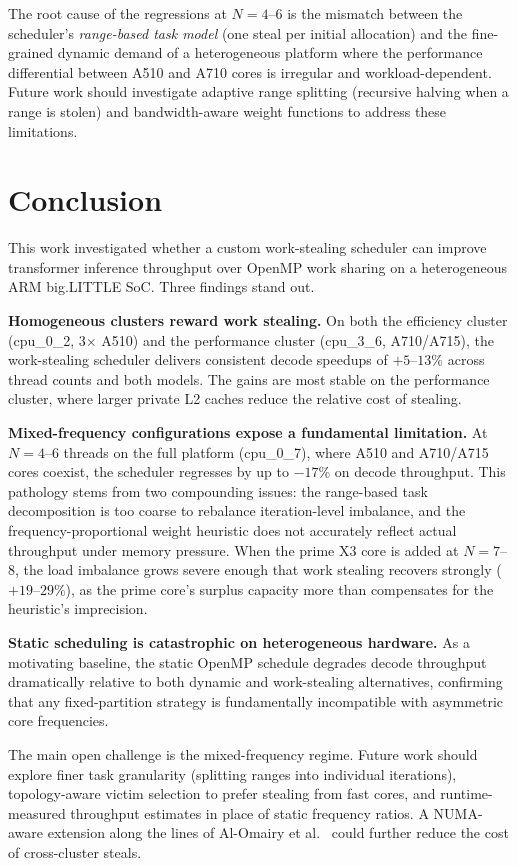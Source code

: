 \documentclass[11pt,english]{article}
\begin{document}
The root cause of the regressions at $N=4$--$6$ is the mismatch between the scheduler's \emph{range-based task model} (one steal per initial allocation) and the fine-grained dynamic demand of a heterogeneous platform where the performance differential between A510 and A710 cores is irregular and workload-dependent. Future work should investigate adaptive range splitting (recursive halving when a range is stolen) and bandwidth-aware weight functions to address these limitations.

\section{Conclusion}
This work investigated whether a custom work-stealing scheduler can improve transformer inference throughput over OpenMP work sharing on a heterogeneous ARM big.LITTLE SoC. Three findings stand out.

\textbf{Homogeneous clusters reward work stealing.} On both the efficiency cluster (cpu\_0\_2, 3$\times$ A510) and the performance cluster (cpu\_3\_6, A710/A715), the work-stealing scheduler delivers consistent decode speedups of $+5$--$13\%$ across thread counts and both models. The gains are most stable on the performance cluster, where larger private L2 caches reduce the relative cost of stealing.

\textbf{Mixed-frequency configurations expose a fundamental limitation.} At $N = 4$--$6$ threads on the full platform (cpu\_0\_7), where A510 and A710/A715 cores coexist, the scheduler regresses by up to $-17\%$ on decode throughput. This pathology stems from two compounding issues: the range-based task decomposition is too coarse to rebalance iteration-level imbalance, and the frequency-proportional weight heuristic does not accurately reflect actual throughput under memory pressure. When the prime X3 core is added at $N = 7$--$8$, the load imbalance grows severe enough that work stealing recovers strongly ($+19$--$29\%$), as the prime core's surplus capacity more than compensates for the heuristic's imprecision.

\textbf{Static scheduling is catastrophic on heterogeneous hardware.} As a motivating baseline, the static OpenMP schedule degrades decode throughput dramatically relative to both dynamic and work-stealing alternatives, confirming that any fixed-partition strategy is fundamentally incompatible with asymmetric core frequencies.

The main open challenge is the mixed-frequency regime. Future work should explore finer task granularity (splitting ranges into individual iterations), topology-aware victim selection to prefer stealing from fast cores, and runtime-measured throughput estimates in place of static frequency ratios. A NUMA-aware extension along the lines of Al-Omairy et al.~\cite{alomairy2015numa} could further reduce the cost of cross-cluster steals.



\end{document}
